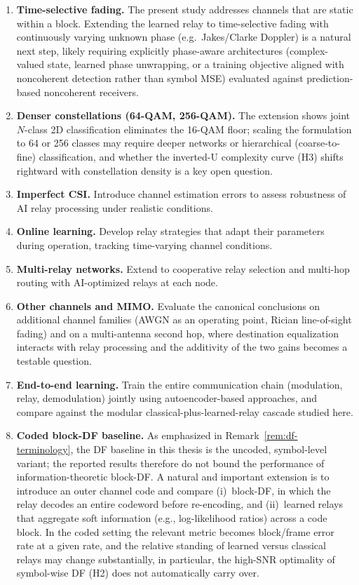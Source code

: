 \begin{enumerate}
\def\labelenumi{\arabic{enumi}.}
\item
  \textbf{Time-selective fading.} The present study addresses channels that are static within a block. Extending the learned relay to time-selective fading with continuously varying unknown phase (e.g.\ Jakes/Clarke Doppler) is a natural next step, likely requiring explicitly phase-aware architectures (complex-valued state, learned phase unwrapping, or a training objective aligned with noncoherent detection rather than symbol MSE) evaluated against prediction-based noncoherent receivers.
\item
  \textbf{Denser constellations (64-QAM, 256-QAM).} The extension shows joint $N$-class 2D classification eliminates the 16-QAM floor; scaling the formulation to 64 or 256 classes may require deeper networks or hierarchical (coarse-to-fine) classification, and whether the inverted-U complexity curve (H3) shifts rightward with constellation density is a key open question.
\item
  \textbf{Imperfect CSI.} Introduce channel estimation errors to assess robustness of AI relay processing under realistic conditions.
\item
  \textbf{Online learning.} Develop relay strategies that adapt their parameters during operation, tracking time-varying channel conditions.
\item
  \textbf{Multi-relay networks.} Extend to cooperative relay selection and multi-hop routing with AI-optimized relays at each node.
\item
  \textbf{Other channels and MIMO.} Evaluate the canonical conclusions on additional channel families (AWGN as an operating point, Rician line-of-sight fading) and on a multi-antenna second hop, where destination equalization interacts with relay processing and the additivity of the two gains becomes a testable question.
\item
  \textbf{End-to-end learning.} Train the entire communication chain (modulation, relay, demodulation) jointly using autoencoder-based approaches, and compare against the modular classical-plus-learned-relay cascade studied here.
\item
  \textbf{Coded block-DF baseline.} As emphasized in Remark~\ref{rem:df-terminology}, the DF baseline in this thesis is the uncoded, symbol-level variant; the reported results therefore do not bound the performance of information-theoretic block-DF. A natural and important extension is to introduce an outer channel code and compare (i)~block-DF, in which the relay decodes an entire codeword before re-encoding, and (ii)~learned relays that aggregate soft information (e.g., log-likelihood ratios) across a code block. In the coded setting the relevant metric becomes block/frame error rate at a given rate, and the relative standing of learned versus classical relays may change substantially, in particular, the high-SNR optimality of symbol-wise DF (H2) does not automatically carry over.

\end{enumerate}
